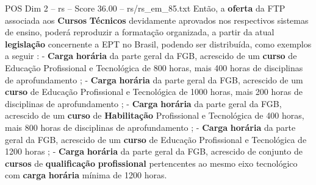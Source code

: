 \begin{textsample}{POS Dim 2 – rs – Score 36.00 – rs/rs\_em\_85.txt}
Então, a \textbf{oferta} da FTP associada aos \textbf{Cursos} \textbf{Técnicos} devidamente aprovados nos respectivos sistemas de ensino, poderá reproduzir a formatação organizada, a partir da atual \textbf{legislação} concernente a EPT no Brasil, podendo ser distribuída, como exemplos a seguir : - \textbf{Carga} \textbf{horária} da parte geral da FGB, acrescido de um \textbf{curso} de Educação Profissional e Tecnológica de 800 horas, mais 400 horas de disciplinas de aprofundamento ; - \textbf{Carga} \textbf{horária} da parte geral da FGB, acrescido de um \textbf{curso} de Educação Profissional e Tecnológica de 1000 horas, mais 200 horas de disciplinas de aprofundamento ; - \textbf{Carga} \textbf{horária} da parte geral da FGB, acrescido de um \textbf{curso} de \textbf{Habilitação} Profissional e Tecnológica de 400 horas, mais 800 horas de disciplinas de aprofundamento ; - \textbf{Carga} \textbf{horária} da parte geral da FGB, acrescido de um \textbf{curso} de Educação Profissional e Tecnológica de 1200 horas ; - \textbf{Carga} \textbf{horária} da parte geral da FGB, acrescido de conjunto de \textbf{cursos} de \textbf{qualificação} \textbf{profissional} pertencentes ao mesmo eixo tecnológico com \textbf{carga} \textbf{horária} mínima de 1200 horas.

\end{textsample}
